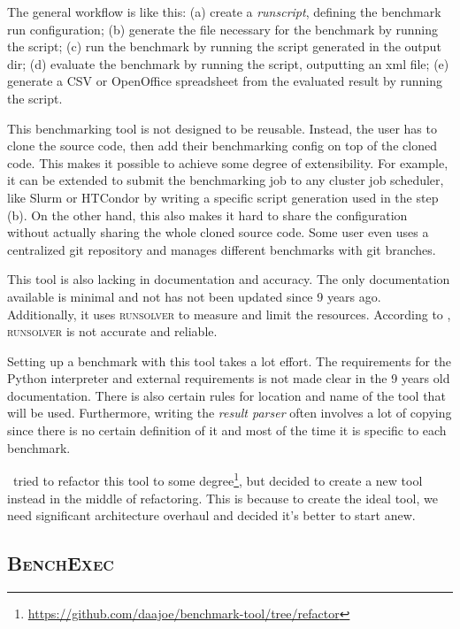 The general workflow is like this:
(a) create a \textit{runscript}, defining the benchmark run configuration;
(b) generate the file necessary for the benchmark by running the  script;
(c) run the benchmark by running the script generated in the output dir;
(d) evaluate the benchmark by running the  script, outputting an xml file;
(e) generate a CSV or OpenOffice spreadsheet from the evaluated result by running the  script.

This benchmarking tool is not designed to be reusable.
Instead, the user has to clone the source code, then add their benchmarking config on top of the cloned code.
This makes it possible to achieve some degree of extensibility.
For example, it can be extended to submit the benchmarking job to any cluster job scheduler, like Slurm or HTCondor by writing a specific script generation used in the step (b).
On the other hand, this also makes it hard to share the configuration without actually sharing the whole cloned source code.
Some user even uses a centralized git repository and manages different benchmarks with git branches.

This tool is also lacking in documentation and accuracy.
The only documentation available is minimal and not has not been updated since 9 years ago.
Additionally, it uses \textsc{runsolver} to measure and limit the resources.
According to \citet{beyerReliableBenchmarkingRequirements2019}, \textsc{runsolver} is not accurate and reliable.

Setting up a benchmark with this tool takes a lot effort.
The requirements for the Python interpreter and external requirements is not made clear in the 9 years old documentation.
There is also certain rules for location and name of the tool that will be used.
Furthermore, writing the \textit{result parser} often involves a lot of copying since there is no certain definition of it and most of the time it is specific to each benchmark.

\First~tried to refactor this tool to some degree\footnote{\href{https://github.com/daajoe/benchmark-tool/tree/refactor}{https://github.com/daajoe/benchmark-tool/tree/refactor}}, but decided to create a new tool instead in the middle of refactoring.
This is because to create the ideal tool, we need significant architecture overhaul and decided it's better to start anew.

\subsection{\textsc{BenchExec}}
\label{sec:benchmarking.impl.benchexec}

